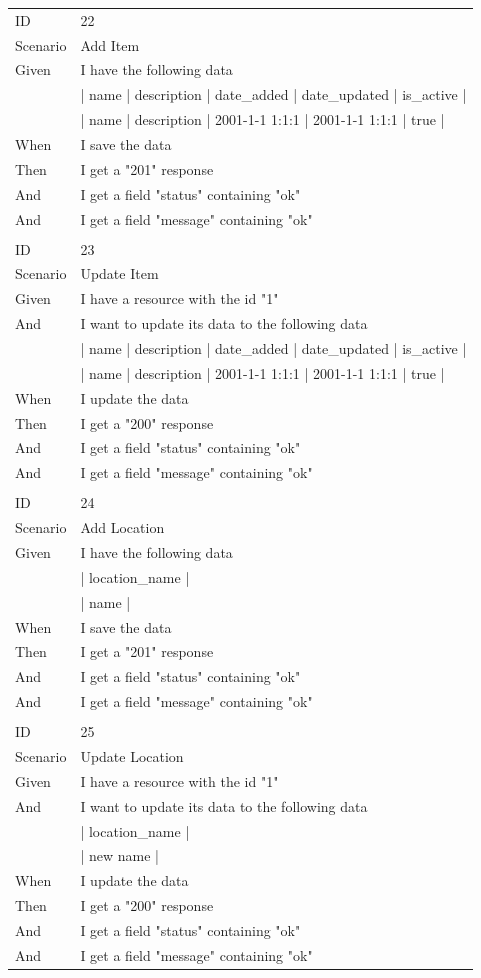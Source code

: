 \documentclass{report}
\begin{document}
\begin{tabular}{ l l }
ID 			& 22\\
Scenario		& Add Item \\
Given 		& I have the following data \\
	      	& | name | description | date\_added     | date\_updated   | is\_active | \\
      		& | name | description | 2001-1-1 1:1:1 | 2001-1-1 1:1:1 | true      | \\
When 		& I save the data \\
Then 		& I get a "201" response \\
And 			& I get a field "status" containing "ok" \\
And 			& I get a field "message" containing "ok" \\ \\
ID 			& 23\\
Scenario		& Update Item \\
Given 		& I have a resource with the id "1" \\
And 			& I want to update its data to the following data \\
      		& | name | description | date\_added     | date\_updated   | is\_active | \\
      		& | name | description | 2001-1-1 1:1:1 | 2001-1-1 1:1:1 | true      | \\
When 		& I update the data \\
Then 		& I get a "200" response \\
And 			& I get a field "status" containing "ok" \\
And 			& I get a field "message" containing "ok" \\ \\
ID 			& 24\\
Scenario		& Add Location \\
Given 		& I have the following data \\
      		& | location\_name | \\
      		& | name      |\\
When 		&  I save the data \\
Then 		& I get a "201" response \\
And 			& I get a field "status" containing "ok" \\
And 			& I get a field "message" containing "ok" \\ \\
ID 			& 25\\
Scenario		& Update Location \\
Given 		& I have a resource with the id "1" \\
And 			& I want to update its data to the following data \\
      		& | location\_name | \\
      		& | new name      | \\
When 		& I update the data \\
Then 		& I get a "200" response \\
And 			& I get a field "status" containing "ok" \\
And 			& I get a field "message" containing "ok" \\
\end{tabular}
\newpage
\end{document}
